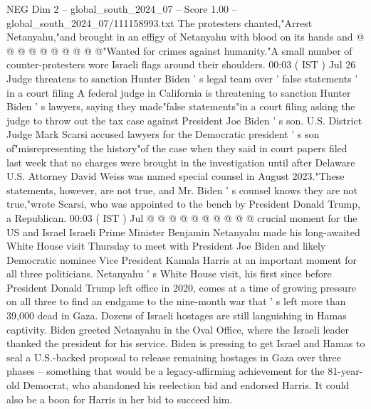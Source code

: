 \begin{textsample}{NEG Dim 2 – global\_south\_2024\_07 – Score 1.00 – global\_south\_2024\_07/111158993.txt}
The protesters chanted,"Arrest Netanyahu,"and brought in an effigy of Netanyahu with blood on its hands and @ @ @ @ @ @ @ @ @ @"Wanted for crimes against humanity."A small number of counter-protesters wore Israeli flags around their shoulders. 00:03 ( IST ) Jul 26 Judge threatens to sanction Hunter Biden ' s legal team over ' false statements ' in a court filing A federal judge in California is threatening to sanction Hunter Biden ' s lawyers, saying they made"false statements"in a court filing asking the judge to throw out the tax case against President Joe Biden ' s son.
U.S.
District Judge Mark Scarsi accused lawyers for the Democratic president ' s son of"misrepresenting the history"of the case when they said in court papers filed last week that no charges were brought in the investigation until after Delaware U.S.
Attorney David Weiss was named special counsel in August 2023."These statements, however, are not true, and Mr.
Biden ' s counsel knows they are not true,"wrote Scarsi, who was appointed to the bench by President Donald Trump, a Republican. 00:03 ( IST ) Jul @ @ @ @ @ @ @ @ @ @ crucial moment for the US and Israel Israeli Prime Minister Benjamin Netanyahu made his long-awaited White House visit Thursday to meet with President Joe Biden and likely Democratic nominee Vice President Kamala Harris at an important moment for all three politicians.
Netanyahu ' s White House visit, his first since before President Donald Trump left office in 2020, comes at a time of growing pressure on all three to find an endgame to the nine-month war that ' s left more than 39,000 dead in Gaza.
Dozens of Israeli hostages are still languishing in Hamas captivity.
Biden greeted Netanyahu in the Oval Office, where the Israeli leader thanked the president for his service.
Biden is pressing to get Israel and Hamas to seal a U.S.-backed proposal to release remaining hostages in Gaza over three phases -- something that would be a legacy-affirming achievement for the 81-year-old Democrat, who abandoned his reelection bid and endorsed Harris.
It could also be a boon for Harris in her bid to succeed him.

\end{textsample}

